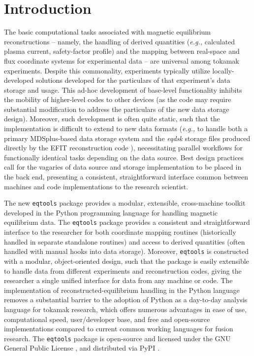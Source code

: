 \documentclass[12pt,floatfix,showpacs]{revtex4-1}
\newcommand{\eg}{\emph{e.g., }}
\newcommand{\eqtools}{\texttt{eqtools}\xspace}
\begin{document}

\section{Introduction}\label{sec:intro}

The basic computational tasks associated with magnetic equilibrium reconstructions -- namely, the handling of derived quantities (\eg calculated plasma current, safety-factor profile) and the mapping between real-space and flux coordinate systems for experimental data -- are universal among tokamak experiments.  
Despite this commonality, experiments typically utilize locally-developed solutions developed for the particulars of that experiment's data storage and usage.  
This ad-hoc development of base-level functionality inhibits the mobility of higher-level codes to other devices (as the code may require substantial modification to address the particulars of the new data storage design).  
Moreover, such development is often quite static, such that the implementation is difficult to extend to new data formats (\eg to handle both a primary MDSplus-based data storage system \cite{MDSplus} and the \emph{eqdsk} storage files produced directly by the EFIT reconstruction code \cite{Lao1985}), necessitating parallel workflows for functionally identical tasks depending on the data source.  
Best design practices call for the vagaries of data source and storage implementation to be placed in the back end, presenting a consistent, straightforward interface common between machines and code implementations to the research scientist.

The new \eqtools package provides a modular, extensible, cross-machine toolkit developed in the Python programming language for handling magnetic equilibrium data.  
The \eqtools package provides a consistent and straightforward interface to the researcher for both coordinate mapping routines (historically handled in separate standalone routines) and access to derived quantities (often handled with manual hooks into data storage).  
Moreover, \eqtools is constructed with a modular, object-oriented design, such that the package is easily extensible to handle data from different experiments and reconstruction codes, giving the researcher a single unified interface for data from any machine or code.  
The implementation of reconstructed-equilibrium handling in the Python language removes a substantial barrier to the adoption of Python as a day-to-day analysis language for tokamak research, which offers numerous advantages in ease of use, computational speed, user/developer base, and free and open-source implementations compared to current common working languages for fusion research.  The \eqtools package is open-source and licensed under the GNU General Public License \cite{GPL}, and distributed via PyPI \cite{eqtools_pypi,*eqtools_git,*eqtools_readthedocs}.
\end{document}
